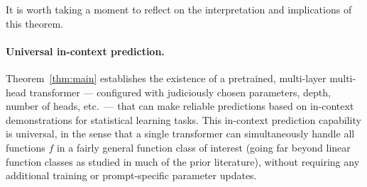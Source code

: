 \documentclass[english]{article}
\begin{document}
It is worth taking a moment to reflect on the interpretation and implications of this theorem. 

    
\paragraph{Universal in-context prediction.} 
    Theorem~\ref{thm:main} establishes the existence of a pretrained, multi-layer multi-head transformer --- configured with judiciously chosen parameters, depth, number of heads, etc.~--- that can make reliable predictions based on in-context demonstrations for statistical learning tasks. 
		This in-context prediction capability is universal, in the sense that a single transformer can simultaneously handle all functions $f$ in a fairly general function class of interest (going far beyond linear function classes as studied in much of the prior literature), without requiring any additional training or prompt-specific parameter updates.  




\end{document}
